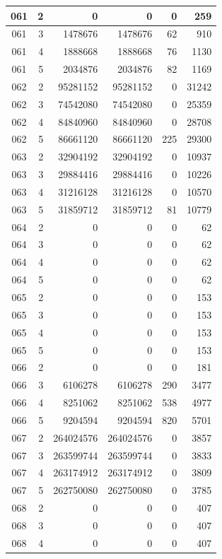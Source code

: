 \begin{longtable}{|c|r|r|r|r|r|}
\hline
061 & 2 & 0 & 0 & 0 & 259 \\
\hline
061 & 3 & 1478676 & 1478676 & 62 & 910 \\
\hline
061 & 4 & 1888668 & 1888668 & 76 & 1130 \\
\hline
061 & 5 & 2034876 & 2034876 & 82 & 1169 \\
\hline
062 & 2 & 95281152 & 95281152 & 0 & 31242 \\
\hline
062 & 3 & 74542080 & 74542080 & 0 & 25359 \\
\hline
062 & 4 & 84840960 & 84840960 & 0 & 28708 \\
\hline
062 & 5 & 86661120 & 86661120 & 225 & 29300 \\
\hline
063 & 2 & 32904192 & 32904192 & 0 & 10937 \\
\hline
063 & 3 & 29884416 & 29884416 & 0 & 10226 \\
\hline
063 & 4 & 31216128 & 31216128 & 0 & 10570 \\
\hline
063 & 5 & 31859712 & 31859712 & 81 & 10779 \\
\hline
064 & 2 & 0 & 0 & 0 & 62 \\
\hline
064 & 3 & 0 & 0 & 0 & 62 \\
\hline
064 & 4 & 0 & 0 & 0 & 62 \\
\hline
064 & 5 & 0 & 0 & 0 & 62 \\
\hline
065 & 2 & 0 & 0 & 0 & 153 \\
\hline
065 & 3 & 0 & 0 & 0 & 153 \\
\hline
065 & 4 & 0 & 0 & 0 & 153 \\
\hline
065 & 5 & 0 & 0 & 0 & 153 \\
\hline
066 & 2 & 0 & 0 & 0 & 181 \\
\hline
066 & 3 & 6106278 & 6106278 & 290 & 3477 \\
\hline
066 & 4 & 8251062 & 8251062 & 538 & 4977 \\
\hline
066 & 5 & 9204594 & 9204594 & 820 & 5701 \\
\hline
067 & 2 & 264024576 & 264024576 & 0 & 3857 \\
\hline
067 & 3 & 263599744 & 263599744 & 0 & 3833 \\
\hline
067 & 4 & 263174912 & 263174912 & 0 & 3809 \\
\hline
067 & 5 & 262750080 & 262750080 & 0 & 3785 \\
\hline
068 & 2 & 0 & 0 & 0 & 407 \\
\hline
068 & 3 & 0 & 0 & 0 & 407 \\
\hline
068 & 4 & 0 & 0 & 0 & 407 \\

\end{longtable}
